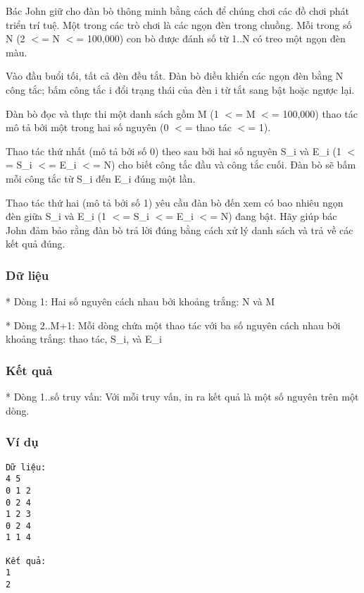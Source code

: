 



   Bác John giữ cho đàn bò thông minh bằng cách để chúng chơi các đồ chơi phát triển trí tuệ. Một trong các trò chơi là các ngọn đèn trong chuồng. Mỗi trong số N (2 $<$= N $<$= 100,000) con bò được đánh số từ 1..N có treo một ngọn đèn màu.  

   Vào đầu buổi tối, tất cả đèn đều tắt. Đàn bò điều khiển các ngọn đèn bằng N công tắc; bấm công tắc i đổi trạng thái của đèn i từ tắt sang bật hoặc ngược lại.  

   Đàn bò đọc và thực thi một danh sách gồm M (1 $<$= M $<$= 100,000) thao tác mô tả bởi một trong hai số nguyên (0 $<$= thao tác $<$= 1).  

   Thao tác thứ nhất (mô tả bởi số 0) theo sau bởi hai số nguyên S\_i và E\_i (1 $<$= S\_i $<$= E\_i $<$= N) cho biết công tắc đầu và công tắc cuối. Đàn bò sẽ bấm mỗi công tắc từ S\_i đến E\_i đúng một lần.  

   Thao tác thứ hai (mô tả bởi số 1) yêu cầu đàn bò đến xem có bao nhiêu ngọn đèn giữa S\_i và E\_i (1 $<$= S\_i $<$= E\_i $<$= N) đang bật. Hãy giúp bác John đảm bảo rằng đàn bò trả lời đúng bằng cách xử lý danh sách và trả về các kết quả đúng.  

\subsubsection{   Dữ liệu  }

   * Dòng 1: Hai số nguyên cách nhau bởi khoảng trắng: N và M  

   * Dòng 2..M+1: Mỗi dòng chứa một thao tác với ba số nguyên cách nhau bởi khoảng trắng: thao tác, S\_i, và E\_i  

\subsubsection{   Kết quả  }

   * Dòng 1..số truy vấn: Với mỗi truy vấn, in ra kết quả là một số nguyên trên một dòng.  

\subsubsection{   Ví dụ  }
\begin{verbatim}
Dữ liệu:
4 5
0 1 2
0 2 4
1 2 3
0 2 4
1 1 4

Kết quả:
1
2
\end{verbatim}